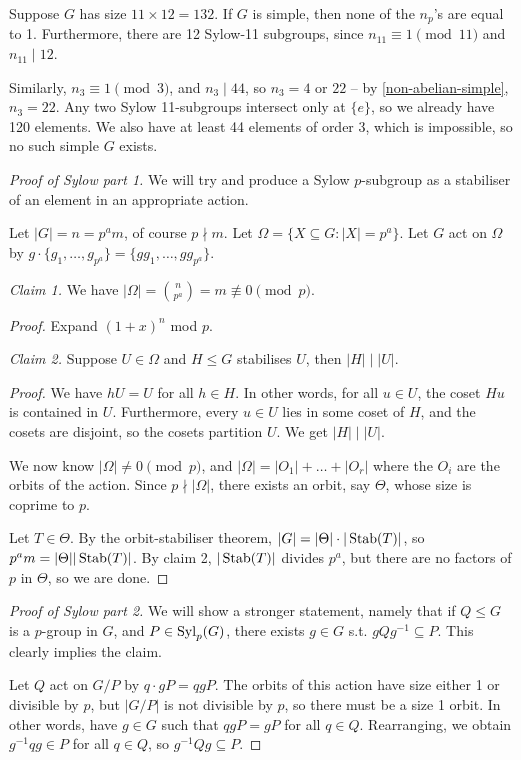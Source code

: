 \documentclass{../template/note}
\begin{document}
    \begin{example*}
        Suppose $G$ has size $11 \times 12 = 132$. If $G$ is simple, then none of the $n_p$'s are equal to 1. Furthermore, there are 12 Sylow-11 subgroups, since $n_11 \equiv 1 \pmod 11$ and $n_11 \mid 12$.

        Similarly, $n_3 \equiv 1 \pmod 3$, and $n_3 \mid 44$, so $n_3 = 4$ or $22$ -- by \cref{non-abelian-simple}, $n_3 = 22$. Any two Sylow 11-subgroups intersect only at $\{e\}$, so we already have 120 elements. We also have at least 44 elements of order 3, which is impossible, so no such simple $G$ exists.
    \end{example*}
    
    \begin{proof}[Proof of Sylow part 1]
        We will try and produce a Sylow $p$-subgroup as a stabiliser of an element in an appropriate action.

        Let $|G| = n = p^am$, of course $p \nmid m$. Let $\Omega = \{X \subseteq G : |X| = p^a\}$. Let $G$ act on $\Omega$ by $g \cdot \{g_1, \dots, g_{p^a}\} = \{gg_1, \dots, gg_{p^a}\}$.

        \emph{Claim 1.} We have $|\Omega| = \binom n {p^a} = m \not\equiv 0\pmod p$.

        \emph{Proof.} Expand $(1+x)^n$ mod $p$.

        \emph{Claim 2.} Suppose $U \in \Omega$ and $H \leq G$ stabilises $U$, then $|H| \mid |U|$.

        \emph{Proof.} We have $hU = U$ for all $h \in H$. In other words, for all $u \in U$, the coset $Hu$ is contained in $U$. Furthermore, every $u \in U$ lies in some coset of $H$, and the cosets are disjoint, so the cosets partition $U$. We get $|H| \mid |U|$.

        We now know $|\Omega| \neq 0 \pmod p$, and $|\Omega| = |O_1| + \dots + |O_r|$ where the $O_i$ are the orbits of the action. Since $p \nmid |\Omega|$, there exists an orbit, say $\Theta$, whose size is coprime to $p$.

        Let $T \in \Theta$. By the orbit-stabiliser theorem, $|G| = |\Theta|\cdot|\operatorname{Stab}(T)|$, so $p^am = |\Theta||\operatorname{Stab}(T)|$. By claim 2, $|\operatorname{Stab}(T)|$ divides $p^a$, but there are no factors of $p$ in $\Theta$, so we are done.
    \end{proof}
    

    \begin{proof}[Proof of Sylow part 2]
        We will show a stronger statement, namely that if $Q \leq G$ is a $p$-group in $G$, and $P \in \operatorname{Syl}_p(G)$, there exists $g \in G$ s.t. $gQg^{-1} \subseteq P$. This clearly implies the claim.

        Let $Q$ act on $G/P$ by $q \cdot gP = qgP$. The orbits of this action have size either 1 or divisible by $p$, but $|G/P|$ is not divisible by $p$, so there must be a size 1 orbit. In other words, have $g \in G$ such that $qgP = gP$ for all $q \in Q$. Rearranging, we obtain $g^{-1}qg \in P$ for all $q \in Q$, so $g^{-1}Qg \subseteq P$.
    \end{proof}
\end{document}
